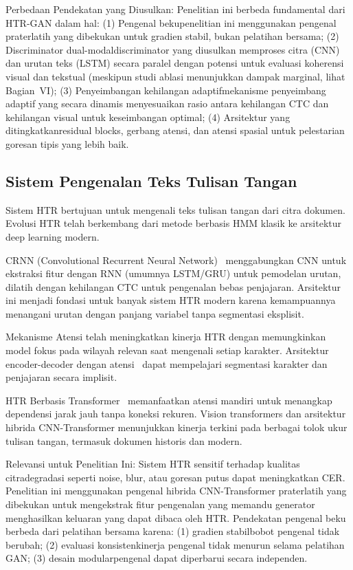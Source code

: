 \documentclass[journal]{IEEEtran}
\begin{document}
Perbedaan Pendekatan yang Diusulkan: Penelitian ini berbeda fundamental dari HTR-GAN dalam hal: (1) Pengenal beku\textemdash penelitian ini menggunakan pengenal praterlatih yang dibekukan untuk gradien stabil, bukan pelatihan bersama; (2) Discriminator dual-modal\textemdash discriminator yang diusulkan memproses citra (CNN) dan urutan teks (LSTM) secara paralel dengan potensi untuk evaluasi koherensi visual dan tekstual (meskipun studi ablasi menunjukkan dampak marginal, lihat Bagian~VI); (3) Penyeimbangan kehilangan adaptif\textemdash mekanisme penyeimbang adaptif yang secara dinamis menyesuaikan rasio antara kehilangan CTC dan kehilangan visual untuk keseimbangan optimal; (4) Arsitektur yang ditingkatkan\textemdash residual blocks, gerbang atensi, dan atensi spasial untuk pelestarian goresan tipis yang lebih baik.

\subsection{Sistem Pengenalan Teks Tulisan Tangan}

Sistem HTR bertujuan untuk mengenali teks tulisan tangan dari citra dokumen. Evolusi HTR telah berkembang dari metode berbasis HMM klasik ke arsitektur deep learning modern.

CRNN (Convolutional Recurrent Neural Network)~\cite{shi2016crnn} menggabungkan CNN untuk ekstraksi fitur dengan RNN (umumnya LSTM/GRU) untuk pemodelan urutan, dilatih dengan kehilangan CTC untuk pengenalan bebas penjajaran. Arsitektur ini menjadi fondasi untuk banyak sistem HTR modern karena kemampuannya menangani urutan dengan panjang variabel tanpa segmentasi eksplisit.

Mekanisme Atensi telah meningkatkan kinerja HTR dengan memungkinkan model fokus pada wilayah relevan saat mengenali setiap karakter. Arsitektur encoder-decoder dengan atensi~\cite{bluche2017scan} dapat mempelajari segmentasi karakter dan penjajaran secara implisit.

HTR Berbasis Transformer~\cite{michael2019evaluating,diaz2021rethinking} memanfaatkan atensi mandiri untuk menangkap dependensi jarak jauh tanpa koneksi rekuren. Vision transformers dan arsitektur hibrida CNN-Transformer menunjukkan kinerja terkini pada berbagai tolok ukur tulisan tangan, termasuk dokumen historis dan modern.

Relevansi untuk Penelitian Ini: Sistem HTR sensitif terhadap kualitas citra\textemdash degradasi seperti noise, blur, atau goresan putus dapat meningkatkan CER. Penelitian ini menggunakan pengenal hibrida CNN-Transformer praterlatih yang dibekukan untuk mengekstrak fitur pengenalan yang memandu generator menghasilkan keluaran yang dapat dibaca oleh HTR. Pendekatan pengenal beku berbeda dari pelatihan bersama karena: (1) gradien stabil\textemdash bobot pengenal tidak berubah; (2) evaluasi konsisten\textemdash kinerja pengenal tidak menurun selama pelatihan GAN; (3) desain modular\textemdash pengenal dapat diperbarui secara independen.
\end{document}
